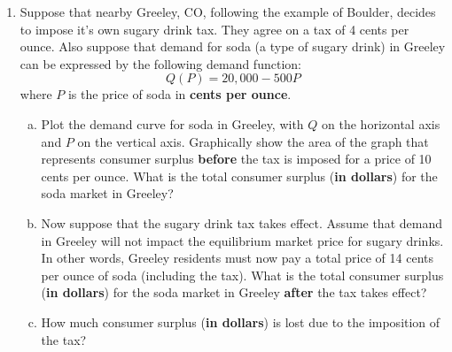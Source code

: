 \documentclass[11pt]{article}
\begin{document}
\begin{enumerate}
  \begin{enumerate}[(a)]
    \item Solve the consumer's constrained optimization problem for each of  $P_{x}^{1}$,  $P_{x}^{2}$, and  $P_{x}^{3}$.

	\newpage
    \item Graph the budget constraints and indifference curves with the optimal bundle from part (a) on a single graph.  Label each of the optimal bundles from part (a).  On this graph trace out the consumer's Price Consumption Curve.  \emph{(Hint: See section 5.1 from the textbook for an example)}
    
    
    \vspace*{100mm}
	\item Use the Price Consumption Curve from part (b) to graph the consumer's demand curve for good x. \emph{(Hint: See section 5.1 from the textbook for an example)}
  \end{enumerate}
  
  \newpage 
  \item Suppose that nearby Greeley, CO, following the example of Boulder, decides to impose it's own sugary drink tax. They agree on a tax of 4 cents per ounce. Also suppose that demand for soda (a type of sugary drink) in Greeley can be expressed by the following demand function:
  $$
    Q(P) = 20,000 - 500P
  $$
  where $P$ is the price of soda in \textbf{cents per ounce}.

  \begin{enumerate}[(a)]
    \item Plot the demand curve for soda in Greeley, with $Q$ on the horizontal axis and $P$ on the vertical axis. Graphically show the area of the graph that represents consumer surplus \textbf{before} the tax is imposed for a price of 10 cents per ounce. What is the total consumer surplus (\textbf{in dollars}) for the soda market in Greeley?
    
    \vspace*{70mm}
    \item Now suppose that the sugary drink tax takes effect. Assume that demand in Greeley will not impact the equilibrium market price for sugary drinks. In other words, Greeley residents must now pay a total price of 14 cents per ounce of soda (including the tax). What is the total consumer surplus (\textbf{in dollars}) for the soda market in Greeley \textbf{after} the tax takes effect?
    
    \vspace*{50mm}
    \item How much consumer surplus (\textbf{in dollars}) is lost due to the imposition of the tax?
  \end{enumerate}
  \newpage
\end{enumerate}
\end{document}
